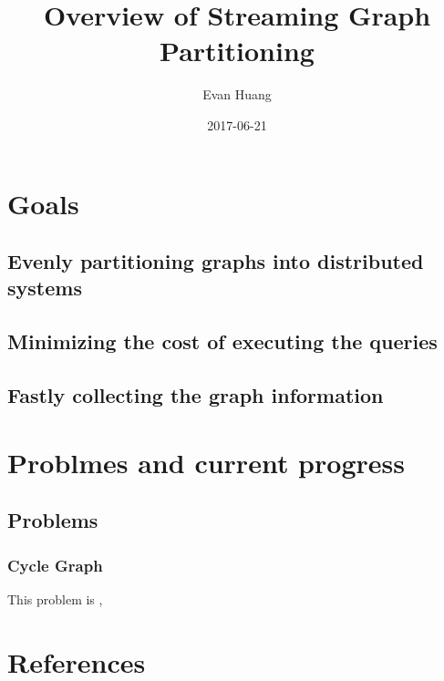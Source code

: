\documentclass{article}
\title{Overview of Streaming Graph Partitioning}
\date{2017-06-21}
\author{Evan Huang}
\begin{document}
	\maketitle
	\newpage

	
	\section{Goals}
	\subsection{Evenly partitioning graphs into distributed systems}
	\subsection{Minimizing the cost of executing the queries}
	\subsection{Fastly collecting the graph information}

	\maketitle
	\newpage
	\section{Problmes and current progress}
	\subsection{Problems}
	\subsubsection{Cycle Graph} This problem is \cite{stanton2012streaming}, 

	\newpage
	\section{References}
	
	
\end{document}
